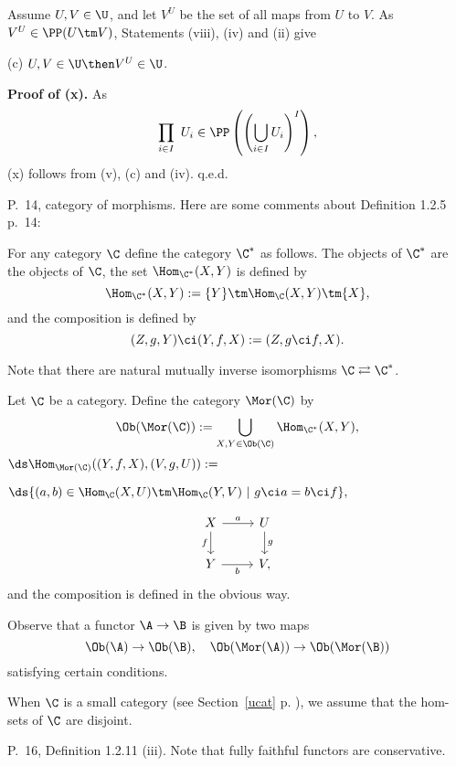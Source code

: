 \documentclass[12pt]{article}
\theoremstyle{remark}
\theoremstyle{definition}
\begin{document}
Assume $U,V\in\U$, and let $V^U$ be the set of all maps from $U$ to $V$. As $V^U\in\PP(U\tm V)$, Statements (viii), (iv) and (ii) give

(c) $U,V\in\U\then V^U\in\U$.

\nn\textbf{Proof of (x).} As 
$$
\prod_{i\in I}\ U_i\in\PP\left(\left(\bigcup_{i\in I}U_i\right)^I\right),
$$
(x) follows from (v), (c) and (iv). q.e.d.



\begin{s}
P.~14, category of morphisms. Here are some comments about Definition 1.2.5 p.~14:

\begin{nota}
For any category $\C$ define the category $\C^*$\index{$\C^*$} as follows. The objects of $\C^*$ are the objects of $\C$, the set $\Hom_{\C^*}(X,Y)$ is defined by 
$$
\Hom_{\C^*}(X,Y):=\{Y\}\tm\Hom_{\C}(X,Y)\tm\{X\},
$$
and the composition is defined by 
$$
(Z,g,Y)\ci(Y,f,X):=(Z,g\ci f,X).
$$ 
\end{nota}

Note that there are natural mutually inverse isomorphisms $\C\rightleftarrows\C^*$. 

\begin{nota}
%
Let $\C$ be a category. Define the category $\Mor(\C)$ \index{$\Mor$} by 
$$
\Ob(\Mor(\C)):=\bigcup_{X,Y\in\Ob(\C)}\Hom_{\C^*}(X,Y),
$$
$\ds\Hom_{\Mor(\C)}((Y,f,X),(V,g,U)):=$\bigskip 

$\hfill\ds\{(a,b)\in\Hom_\C(X,U)\tm\Hom_\C(Y,V)\ | \ g\ci a=b\ci f\},$\bigskip

$$
\begin{tikzcd}
X\ar{d}[swap]{f}\ar{r}{a}&U\ar{d}{g}\\ 
Y\ar{r}[swap]{b}&V,
\end{tikzcd}
$$ 
and the composition is defined in the obvious way.
\end{nota}

Observe that a functor $\A\to\B$ is given by two maps 
$$
\Ob(\A)\to\Ob(\B),\quad\Ob(\Mor(\A))\to\Ob(\Mor(\B))
$$ 
satisfying certain conditions.

When $\C$ is a small category (see Section~\ref{ucat} p. ), we assume that the hom-sets of $\C$ are disjoint.
\end{s}

%

\begin{s}
P.~16, Definition 1.2.11 (iii). Note that fully faithful functors are conservative. 
\end{s}
\end{document}
